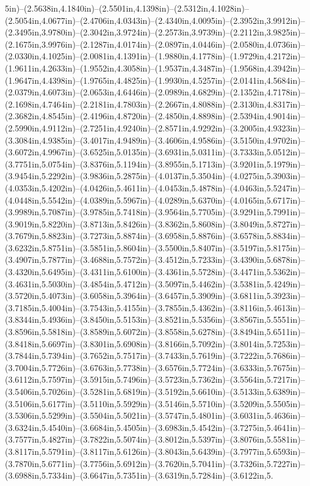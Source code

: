 5in)--(2.5638in,4.1840in)--(2.5501in,4.1398in)--(2.5312in,4.1028in)--(2.5054in,4.0677in)--(2.4706in,4.0343in)--(2.4340in,4.0095in)--(2.3952in,3.9912in)--(2.3495in,3.9780in)--(2.3042in,3.9724in)--(2.2573in,3.9739in)--(2.2112in,3.9825in)--(2.1675in,3.9976in)--(2.1287in,4.0174in)--(2.0897in,4.0446in)--(2.0580in,4.0736in)--(2.0330in,4.1025in)--(2.0081in,4.1391in)--(1.9880in,4.1778in)--(1.9729in,4.2172in)--(1.9611in,4.2633in)--(1.9552in,4.3058in)--(1.9537in,4.3487in)--(1.9568in,4.3942in)--(1.9647in,4.4398in)--(1.9765in,4.4825in)--(1.9930in,4.5257in)--(2.0141in,4.5684in)--(2.0379in,4.6073in)--(2.0653in,4.6446in)--(2.0989in,4.6829in)--(2.1352in,4.7178in)--(2.1698in,4.7464in)--(2.2181in,4.7803in)--(2.2667in,4.8088in)--(2.3130in,4.8317in)--(2.3682in,4.8545in)--(2.4196in,4.8720in)--(2.4850in,4.8898in)--(2.5394in,4.9014in)--(2.5990in,4.9112in)--(2.7251in,4.9240in)--(2.8571in,4.9292in)--(3.2005in,4.9323in)--(3.3084in,4.9385in)--(3.4017in,4.9489in)--(3.4606in,4.9586in)--(3.5150in,4.9702in)--(3.6072in,4.9967in)--(3.6525in,5.0135in)--(3.6931in,5.0311in)--(3.7333in,5.0512in)--(3.7751in,5.0754in)--(3.8376in,5.1194in)--(3.8955in,5.1713in)--(3.9201in,5.1979in)--(3.9454in,5.2292in)--(3.9836in,5.2875in)--(4.0137in,5.3504in)--(4.0275in,5.3903in)--(4.0353in,5.4202in)--(4.0426in,5.4611in)--(4.0453in,5.4878in)--(4.0463in,5.5247in)--(4.0448in,5.5542in)--(4.0389in,5.5967in)--(4.0289in,5.6370in)--(4.0165in,5.6717in)--(3.9989in,5.7087in)--(3.9785in,5.7418in)--(3.9564in,5.7705in)--(3.9291in,5.7991in)--(3.9019in,5.8220in)--(3.8713in,5.8426in)--(3.8362in,5.8608in)--(3.8049in,5.8727in)--(3.7679in,5.8823in)--(3.7273in,5.8874in)--(3.6958in,5.8876in)--(3.6578in,5.8834in)--(3.6232in,5.8751in)--(3.5851in,5.8604in)--(3.5500in,5.8407in)--(3.5197in,5.8175in)--(3.4907in,5.7877in)--(3.4688in,5.7572in)--(3.4512in,5.7233in)--(3.4390in,5.6878in)--(3.4320in,5.6495in)--(3.4311in,5.6100in)--(3.4361in,5.5728in)--(3.4471in,5.5362in)--(3.4631in,5.5030in)--(3.4854in,5.4712in)--(3.5097in,5.4462in)--(3.5381in,5.4249in)--(3.5720in,5.4073in)--(3.6058in,5.3964in)--(3.6457in,5.3909in)--(3.6811in,5.3923in)--(3.7185in,5.4004in)--(3.7543in,5.4155in)--(3.7855in,5.4362in)--(3.8116in,5.4613in)--(3.8344in,5.4936in)--(3.8450in,5.5153in)--(3.8521in,5.5356in)--(3.8567in,5.5551in)--(3.8596in,5.5818in)--(3.8589in,5.6072in)--(3.8558in,5.6278in)--(3.8494in,5.6511in)--(3.8418in,5.6697in)--(3.8301in,5.6908in)--(3.8166in,5.7092in)--(3.8014in,5.7253in)--(3.7844in,5.7394in)--(3.7652in,5.7517in)--(3.7433in,5.7619in)--(3.7222in,5.7686in)--(3.7004in,5.7726in)--(3.6763in,5.7738in)--(3.6576in,5.7724in)--(3.6333in,5.7675in)--(3.6112in,5.7597in)--(3.5915in,5.7496in)--(3.5723in,5.7362in)--(3.5564in,5.7217in)--(3.5406in,5.7026in)--(3.5281in,5.6819in)--(3.5192in,5.6610in)--(3.5133in,5.6389in)--(3.5106in,5.6177in)--(3.5110in,5.5929in)--(3.5146in,5.5710in)--(3.5209in,5.5505in)--(3.5306in,5.5299in)--(3.5504in,5.5021in)--(3.5747in,5.4801in)--(3.6031in,5.4636in)--(3.6324in,5.4540in)--(3.6684in,5.4505in)--(3.6983in,5.4542in)--(3.7275in,5.4641in)--(3.7577in,5.4827in)--(3.7822in,5.5074in)--(3.8012in,5.5397in)--(3.8076in,5.5581in)--(3.8117in,5.5791in)--(3.8117in,5.6126in)--(3.8043in,5.6439in)--(3.7977in,5.6593in)--(3.7870in,5.6771in)--(3.7756in,5.6912in)--(3.7620in,5.7041in)--(3.7326in,5.7227in)--(3.6988in,5.7334in)--(3.6647in,5.7351in)--(3.6319in,5.7284in)--(3.6122in,5.